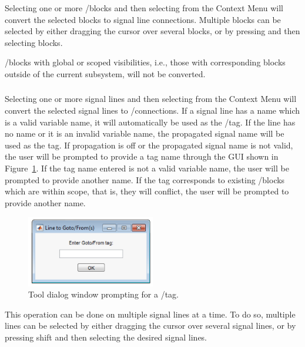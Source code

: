 \documentclass{article}
\newcommand{\menu}[2]{%
	\ifthenelse{\equal{#1}{1}}{Goto/Froms to Line}{}%
  	\ifthenelse{\equal{#1}{2}}{Line to Goto/Froms}{}%
}
\begin{document}
\subsubsection*{}
Selecting one or more \goto/\from blocks and then selecting  from the Context Menu will convert the selected blocks to signal line connections. 
Multiple blocks can be selected by either dragging the cursor over several blocks, or by pressing  and then selecting blocks.

\goto/\from blocks with global or scoped visibilities, i.e., those with corresponding blocks outside of the current subsystem, will not be converted.

\subsubsection*{}
Selecting one or more signal lines and then selecting  from the Context Menu will convert the selected signal lines to \goto/\from connections. If a signal line has a name which is a valid variable name, it will automatically be used as the \goto/\from tag. If the line has no name or it is an invalid variable name, the propagated signal name will be used as the tag. If propagation is off or the propagated signal name is not valid, the user will be prompted to provide a tag name through the GUI shown in Figure~\ref{FIG:prompt_name}. If the tag name entered is not a valid variable name, the user will be prompted to provide another name. If the tag corresponds to existing \goto/\from blocks which are within scope, that is, they will conflict, the user will be prompted to provide another name.

\begin{figure}
	\centering
	\includegraphics[width=0.5\textwidth]{../figs/Prompt_Name}
	\caption{Tool dialog window prompting for a \goto/\from tag.}
	\label{FIG:prompt_name}
\end{figure}

This operation can be done on multiple signal lines at a time. To do so, multiple lines can be selected by either dragging the cursor over several signal lines, or by pressing shift and then selecting the desired signal lines.
\end{document}
